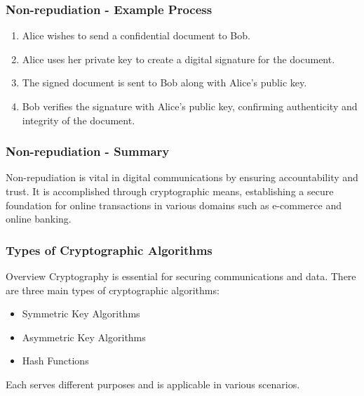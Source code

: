 \documentclass{beamer}
\begin{document}
\begin{frame}[fragile]
    \frametitle{Non-repudiation - Example Process}
    \begin{enumerate}
        \item Alice wishes to send a confidential document to Bob.
        \item Alice uses her private key to create a digital signature for the document.
        \item The signed document is sent to Bob along with Alice's public key.
        \item Bob verifies the signature with Alice's public key, confirming authenticity and integrity of the document.
    \end{enumerate}
\end{frame}

\begin{frame}[fragile]
    \frametitle{Non-repudiation - Summary}
    Non-repudiation is vital in digital communications by ensuring accountability and trust. It is accomplished through cryptographic means, establishing a secure foundation for online transactions in various domains such as e-commerce and online banking.
\end{frame}

\begin{frame}[fragile]
    \frametitle{Types of Cryptographic Algorithms}
    \begin{block}{Overview}
        Cryptography is essential for securing communications and data. There are three main types of cryptographic algorithms:
    \end{block}
    \begin{itemize}
        \item Symmetric Key Algorithms
        \item Asymmetric Key Algorithms
        \item Hash Functions
    \end{itemize}
    Each serves different purposes and is applicable in various scenarios.
\end{frame}
\end{document}
